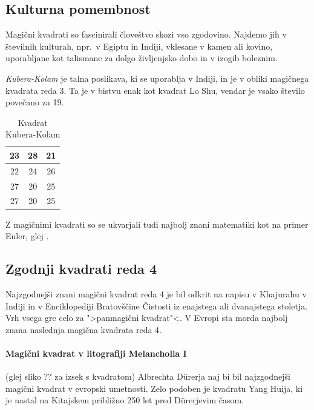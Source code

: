 \documentclass[a4paper,12pt]{article}
\theoremstyle{definition}
\theoremstyle{plain}
\begin{document}

\subsection{Kulturna pomembnost}

Magični kvadrati so fascinirali človeštvo skozi vso zgodovino. Najdemo jih
v številnih kulturah, npr.\ v Egiptu in Indiji, vklesane v kamen ali
kovino, uporabljane kot talismane za dolgo življenjsko dobo in v
izogib boleznim.

\emph{Kubera-Kolam} je talna poslikava, ki se uporablja v Indiji, in je v
obliki magičnega kvadrata reda 3. Ta je v bistvu enak kot kvadrat
Lo Shu, vendar je vsako število povečano za 19.
\begin{table}[h]
   \centering
   \caption{Kvadrat Kubera-Kolam}
   \label{table:kubera}
   \begin{tabular}{|c|c|c|}
      \hline
      23 & 28 & 21 \\
      \hline
      22 & 24 & 26 \\
      \hline
        27 & 20 & 25\\
      27 & 20 & 25
   \end{tabular}
\end{table}

Z magičnimi kvadrati so se ukvarjali tudi najbolj znani matematiki kot na
primer Euler, glej \cite{euler}.


\subsection{Zgodnji kvadrati reda 4}

Najzgodnejši znani magični kvadrat reda 4 je bil odkrit na napisu
v Khajurahu v Indiji in v Enciklopediji Bratovščine Čistosti iz enajstega
ali dvanajstega stoletja. Vrh vsega gre celo za ">panmagični kvadrat"<.
V Evropi sta morda najbolj znana naslednja magična kvadrata reda 4.

\paragraph{Magični kvadrat v litografiji Melancholia I}
(glej sliko ??
za izsek s kvadratom) Albrechta Dürerja naj bi bil najzgodnejši magični kvadrat
v evropski umetnosti. Zelo podoben je kvadratu Yang Huija, ki je nastal na Kitajskem
približno 250 let pred Dürerjevim časom. %
\end{document}
